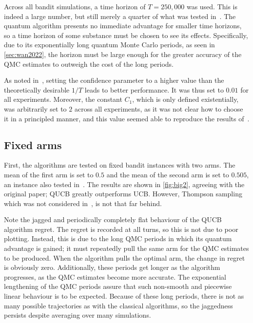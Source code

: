 Across all bandit simulations, a time horizon of $T=250,000$ was used.
This is indeed a large number, but still merely a quarter of what was tested in~\autocite{wan2022}.
The quantum algorithm presents no immediate advantage for smaller time horizons, so  a time horizon of some substance must be chosen to see its effects.
Specifically, due to its exponentially long quantum Monte Carlo periods, as seen in \cref{sec:wan2022}, the horizon must be large enough for the greater accuracy of the QMC estimates to outweigh the cost of the long periods.

As noted in~\autocite{wan2022}, setting the confidence parameter to a higher value than the theoretically desirable $1/T$ leads to better performance.
It was thus set to $0.01$ for all experiments.
Moreover, the constant $C_1$, which is only defined existentially, was arbitrarily set to $2$ across all experiments, as it was not clear how to choose it in a principled manner, and this value seemed able to reproduce the results of~\autocite{wan2022}.

\subsection{Fixed arms}
\label{sec:sim_fixed_arms}
First, the algorithms are tested on fixed bandit instances with two arms.
The mean of the first arm is set to $0.5$ and the mean of the second arm is set to $0.505$, an instance also tested in~\autocite{wan2022}.
The results are shown in \cref{fig:big2}, agreeing with the original paper; QUCB greatly outperforms UCB.
However, Thompson sampling which was not considered in~\autocite{wan2022}, is not that far behind.

Note the jagged and periodically completely flat behaviour of the QUCB algorithm regret.
The regret is recorded at all turns, so this is not due to poor plotting.
Instead, this is due to the long QMC periods in which its quantum advantage is gained; it must repeatedly pull the same arm for the QMC estimates to be produced.
When the algorithm pulls the optimal arm, the change in regret is obviously zero.
Additionally, these periods get longer as the algorithm progresses, as the QMC estimates become more accurate.
The exponential lengthening of the QMC periods assure that such non-smooth and piecewise linear behaviour is to be expected.
Because of these long periods, there is not as many possible trajectories as with the classical algorithms, so the jaggedness persists despite averaging over many simulations.

